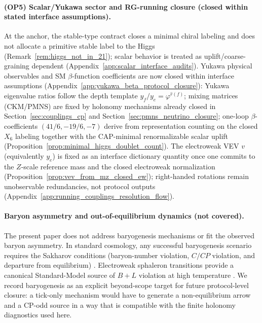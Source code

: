 \paragraph{(OP5) Scalar/Yukawa sector and RG-running closure (closed within stated interface assumptions).}
At the anchor, the stable-type contract closes a minimal chiral labeling and does not allocate a primitive stable label to the Higgs
(Remark~\ref{rem:higgs_not_in_21}); scalar behavior is treated as uplift/coarse-graining dependent (Appendix~\ref{app:scalar_interface_audits}).
Yukawa physical observables and SM $\beta$-function coefficients are now closed within interface assumptions (Appendix~\ref{app:yukawa_beta_protocol_closure}):
Yukawa eigenvalue ratios follow the depth template $y_f/y_e = \varphi^{\hat r(f)}$;
mixing matrices (CKM/PMNS) are fixed by holonomy mechanisms already closed in Section~\ref{sec:couplings_cp} and Section~\ref{sec:pmns_neutrino_closure};
one-loop $\beta$-coefficients $(41/6, -19/6, -7)$ derive from representation counting on the closed $X_6$ labeling together with the CAP-minimal renormalizable scalar uplift (Proposition~\ref{prop:minimal_higgs_doublet_count}).
The electroweak VEV $v$ (equivalently $y_e$) is fixed as an interface dictionary quantity once one commits to the $Z$-scale reference mass and the closed electroweak normalization (Proposition~\ref{prop:vev_from_mz_closed_ew}); right-handed rotations remain unobservable redundancies, not protocol outputs (Appendix~\ref{app:running_couplings_resolution_flow}).

\paragraph{Baryon asymmetry and out-of-equilibrium dynamics (not covered).}
The present paper does not address baryogenesis mechanisms or fit the observed baryon asymmetry.
In standard cosmology, any successful baryogenesis scenario requires the Sakharov conditions (baryon-number violation, $C/CP$ violation, and departure from equilibrium) \cite{Sakharov1967ViolationCAndBaryogenesis}.
Electroweak sphaleron transitions provide a canonical Standard-Model source of $B+L$ violation at high temperature \cite{KuzminRubakovShaposhnikov1985AnomalousBNonconservation}.
We record baryogenesis as an explicit beyond-scope target for future protocol-level closure: a tick-only mechanism would have to generate a non-equilibrium arrow and a CP-odd source in a way that is compatible with the finite holonomy diagnostics used here.

